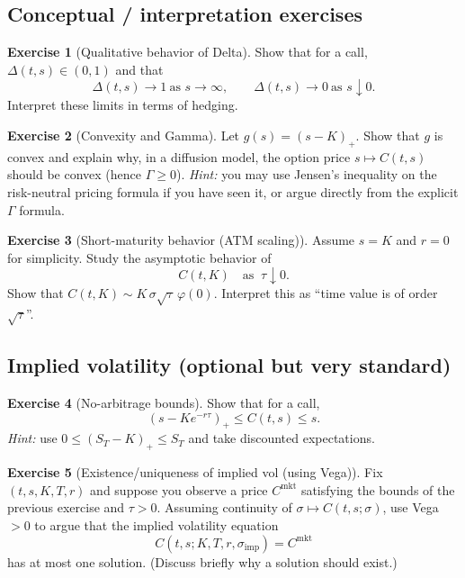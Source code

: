 \documentclass[11pt]{article}
\newcommand{\1}{\mathbf{1}}
\theoremstyle{definition}
\newtheorem{exercise}{Exercise}[section]
\begin{document}
\subsection*{Conceptual / interpretation exercises}

\begin{exercise}[Qualitative behavior of Delta]
Show that for a call, $\Delta(t,s)\in(0,1)$ and that
$$
\Delta(t,s)\to 1\ \text{as } s\to\infty,
\qquad
\Delta(t,s)\to 0\ \text{as } s\downarrow 0.
$$
Interpret these limits in terms of hedging.
\end{exercise}

\begin{exercise}[Convexity and Gamma]
Let $g(s)=(s-K)_+$. Show that $g$ is convex and explain why, in a diffusion model,
the option price $s\mapsto C(t,s)$ should be convex (hence $\Gamma\ge 0$).
\emph{Hint:} you may use Jensen's inequality on the risk-neutral pricing formula if you have seen it,
or argue directly from the explicit $\Gamma$ formula.
\end{exercise}

\begin{exercise}[Short-maturity behavior (ATM scaling)]
Assume $s=K$ and $r=0$ for simplicity. Study the asymptotic behavior of
$$
C(t,K) \quad \text{as }\ \tau\downarrow 0.
$$
Show that $C(t,K)\sim K\,\sigma\sqrt{\tau}\,\varphi(0)$.
Interpret this as ``time value is of order $\sqrt{\tau}$''.
\end{exercise}

\subsection*{Implied volatility (optional but very standard)}

\begin{exercise}[No-arbitrage bounds]
Show that for a call,
$$
(s-K e^{-r\tau})_+ \le C(t,s)\le s.
$$
\emph{Hint:} use $0\le (S_T-K)_+\le S_T$ and take discounted expectations.
\end{exercise}

\begin{exercise}[Existence/uniqueness of implied vol (using Vega)]
Fix $(t,s,K,T,r)$ and suppose you observe a price $C^{\mathrm{mkt}}$ satisfying the
bounds of the previous exercise and $\tau>0$.
Assuming continuity of $\sigma\mapsto C(t,s;\sigma)$, use Vega $>0$ to argue that the
implied volatility equation
$$
C(t,s;K,T,r,\sigma_{\mathrm{imp}})=C^{\mathrm{mkt}}
$$
has at most one solution. (Discuss briefly why a solution should exist.)
\end{exercise}
\end{document}
